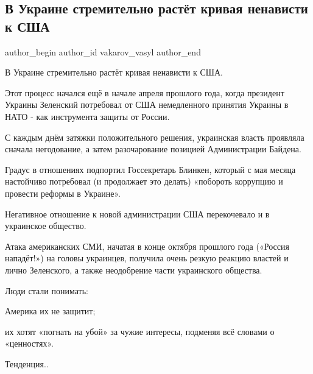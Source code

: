  
 
 
 
 
 
\subsection{В Украине стремительно растёт кривая ненависти к США}
\label{sec:31_01_2022.fb.vakarov_vasyl.1.krivaja_nenavisti_k_usa}
 
\ifcmt
 author_begin
   author_id vakarov_vasyl
 author_end
\fi

В Украине стремительно растёт кривая ненависти к США.

Этот процесс начался ещё в начале апреля прошлого года, когда президент Украины
Зеленский потребовал от США немедленного принятия Украины в НАТО - как
инструмента защиты от России.

С каждым днём затяжки положительного решения, украинская власть проявляла
сначала негодование, а затем разочарование позицией Администрации Байдена.

Градус в отношениях подпортил Госсекретарь Блинкен, который с мая месяца
настойчиво потребовал (и продолжает это делать) «побороть коррупцию и провести
реформы в Украине».

Негативное отношение к новой администрации США перекочевало и в украинское
общество.

Атака американских СМИ, начатая в конце октября прошлого года («Россия
нападёт!») на головы украинцев, получила очень резкую реакцию властей и лично
Зеленского, а также неодобрение части украинского общества.

Люди стали понимать:

Америка их не защитит;

их хотят «погнать на убой» за чужие интересы, подменяя всё словами о
«ценностях».

Тенденция..
